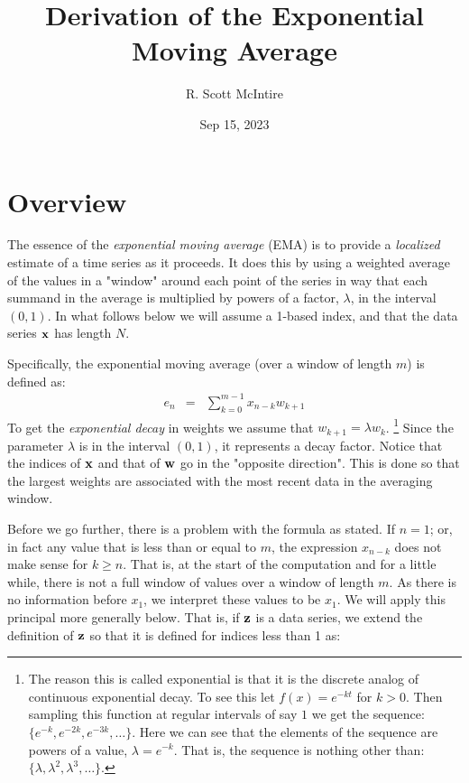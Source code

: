 \documentclass{article}
\title{Derivation of the Exponential Moving Average}
\author{R. Scott McIntire}
\date{Sep 15, 2023}
\begin{document}

\maketitle

\section{Overview}

The essence of the {\em exponential moving average\/} (EMA) is to provide 
a {\em localized\/} estimate of a time series as it proceeds. It does 
this by using a weighted average of the values in a "window" around each point 
of the series in way that each summand in 
the average is multiplied by powers of a factor, $\lambda$,
in the interval $(0,1)$.
In what follows below we will assume a 1-based index, and that 
the data series ${\bf x}$ has length $N$.

Specifically, the exponential moving average (over a window of length $m$) 
is defined as:
\begin{eqnarray}
    e_n &=& \sum_{k=0}^{m-1} x_{n-k} w_{k+1}  \label{ema_def}
\end{eqnarray}
To get the {\em exponential decay\/} in weights we assume that $w_{k+1} = \lambda w_k$.%
\footnote{The reason this is called exponential is that it is the discrete
analog of continuous exponential decay. To see this let $f(x) = e^{-kt}$ 
for $k > 0$. Then sampling this function at regular intervals of say $1$ 
we get the sequence: $\{ e^{-k}, e^{-2k}, e^{-3k}, \ldots \}$.
Here we can see that the elements of the sequence are powers of a value, $\lambda = e^{-k}$.
That is, the sequence is nothing other than: $\{\lambda, \lambda^2, \lambda^3, \ldots \}$.}
Since the parameter $\lambda$ is in the interval $(0,1)$, it represents a decay factor. 
Notice that the indices of ${\bf x}$ and that of ${\bf w}$ go in the "opposite direction".
This is done so that the largest weights are associated with the most recent data
in the averaging window.

Before we go further, there is a problem with the formula as stated.
If $n = 1$; or, in fact any value that is less than or equal to $m$,
the expression $x_{n-k}$ does not make sense for $k \ge n$. That is, at the 
start of the computation and for a little while, there is not a full window
of values over a window of length $m$. As there is no information before $x_1$,
we interpret these values to be $x_1$. 
We will apply this principal more generally below. 
That is, if ${\bf z}$ is a data series,
we extend the definition of ${\bf z}$ so that it is defined for
indices less than 1 as:
\end{document}
